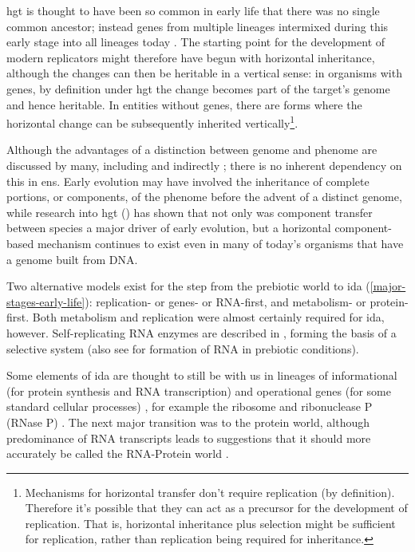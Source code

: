 \Gls{hgt} is thought to have been so common in early life that there was no single common ancestor; instead genes from multiple lineages intermixed during this early stage into all lineages today \parencite{Ragan2009}. The starting point for the development of modern replicators might therefore have begun with horizontal inheritance, although the changes can then be heritable in a vertical sense: in organisms with genes, by definition under \gls{hgt} the change becomes part of the target’s genome and hence heritable. In entities without genes, there are forms where the horizontal change can be subsequently inherited vertically\footnote{Mechanisms for horizontal transfer don’t require replication (by definition). Therefore it’s possible that they can act as a precursor for the development of replication. That is, horizontal inheritance plus selection might be sufficient for replication, rather than replication being required for inheritance.}. 

Although the advantages of a distinction between genome and phenome are discussed by many, including \parencite[section 7.2.3]{Taylor1999} and indirectly \textcite{VonNeumann1966}; there is no inherent dependency on this in \gls{ens}. Early evolution may have involved the inheritance of complete portions, or components, of the phenome before the advent of a distinct genome, while research into \gls{hgt} (\eg \textcite{Ochman2000,Pace:2008vi,Ragan2009}) has shown that not only was component transfer between species a major driver of early evolution, but a horizontal component-based mechanism continues to exist even in many of today's organisms that have a genome built from DNA. 

Two alternative models exist for the step from the prebiotic world  to \gls{ida} (\cref{major-stages-early-life}): replication- or genes- or RNA-first, and metabolism- or protein-first. Both metabolism and replication were almost certainly required for \gls{ida}, however. Self-replicating RNA enzymes are described in \textcite{Lincoln2009}, forming the basis of a selective system (also see \textcite{Cheng2010,Powner2009} for formation of RNA in prebiotic conditions). 

Some elements of \gls{ida}  are thought to still be with us in lineages of informational (for protein synthesis and RNA transcription) and operational genes (for some standard cellular processes) \parencite{Ragan2009}, for example the ribosome and ribonuclease P (RNase P) \parencite{Wilson2009}. The next major transition was to the protein world, although predominance of RNA transcripts leads to suggestions that it should more accurately be called the RNA-Protein world \parencite{Altman2013}. 

